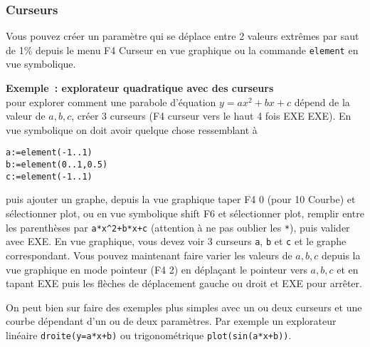 \documentclass{article}
\begin{document}
\begin{giacjshere}


\subsubsection{Curseurs}
Vous pouvez créer un paramètre qui se déplace entre 2 valeurs extrêmes
par saut de 1\% depuis le menu F4 Curseur en vue graphique ou
la commande \verb|element| en vue symbolique.

{\bf Exemple~: explorateur quadratique avec des curseurs}\\
pour explorer comment une parabole d'équation $y=ax^2+bx+c$
dépend de la valeur de $a,b,c$, créer 3 curseurs
(F4 curseur vers le haut 4 fois EXE EXE). En vue symbolique
on doit avoir quelque chose ressemblant à
\begin{verbatim}
a:=element(-1..1)
b:=element(0..1,0.5)
c:=element(-1..1)
\end{verbatim}
puis ajouter un graphe, depuis la vue graphique taper F4 0 (pour 10 Courbe)
et sélectionner plot,
ou en vue symbolique shift F6 et sélectionner plot,
remplir entre les parenthèses par \verb|a*x^2+b*x+c| (attention
à ne pas oublier les \verb|*|), puis valider avec EXE. En vue graphique,
vous devez voir 3 curseurs \verb|a|, \verb|b| et \verb|c| et le
graphe correspondant. Vous pouvez maintenant faire varier les valeurs
de $a,b,c$ depuis la vue graphique en mode pointeur (F4 2) en déplaçant le
pointeur vers $a,b,c$ et en tapant EXE puis les flèches de déplacement
gauche ou droit et EXE pour arrêter.

On peut bien sur faire des exemples plus simples avec un ou deux curseurs
et une courbe dépendant d'un ou de deux paramètres. Par exemple
un explorateur linéaire \verb|droite(y=a*x+b)| ou
trigonométrique \verb|plot(sin(a*x+b))|.


\end{giacjshere}
\end{document}
